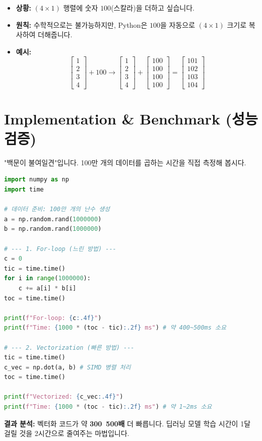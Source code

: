 \documentclass[11pt,a4paper]{book}
\theoremstyle{definition}
\begin{document}
\begin{itemize}
    \item \textbf{상황:} $(4 \times 1)$ 행렬에 숫자 $100$(스칼라)을 더하고 싶습니다.
    \item \textbf{원칙:} 수학적으로는 불가능하지만, Python은 $100$을 자동으로 $(4 \times 1)$ 크기로 복사하여 더해줍니다.
    \item \textbf{예시:} 
    $$ \begin{bmatrix} 1 \\ 2 \\ 3 \\ 4 \end{bmatrix} + 100 \rightarrow \begin{bmatrix} 1 \\ 2 \\ 3 \\ 4 \end{bmatrix} + \begin{bmatrix} 100 \\ 100 \\ 100 \\ 100 \end{bmatrix} = \begin{bmatrix} 101 \\ 102 \\ 103 \\ 104 \end{bmatrix} $$
\end{itemize}

\section{Implementation \& Benchmark (성능 검증)}

"백문이 불여일견"입니다. 100만 개의 데이터를 곱하는 시간을 직접 측정해 봅시다.

\begin{examplebox}[title={For-loop vs Vectorization 속도 대결}]
\begin{lstlisting}[language=Python, breaklines=true]
import numpy as np
import time

# 데이터 준비: 100만 개의 난수 생성
a = np.random.rand(1000000)
b = np.random.rand(1000000)

# --- 1. For-loop (느린 방법) ---
c = 0
tic = time.time()
for i in range(1000000):
    c += a[i] * b[i]
toc = time.time()

print(f"For-loop: {c:.4f}")
print(f"Time: {1000 * (toc - tic):.2f} ms") # 약 400~500ms 소요

# --- 2. Vectorization (빠른 방법) ---
tic = time.time()
c_vec = np.dot(a, b) # SIMD 병렬 처리
toc = time.time()

print(f"Vectorized: {c_vec:.4f}")
print(f"Time: {1000 * (toc - tic):.2f} ms") # 약 1~2ms 소요
\end{lstlisting}
\textbf{결과 분석:} 벡터화 코드가 약 \textbf{300~500배} 더 빠릅니다. 딥러닝 모델 학습 시간이 1달 걸릴 것을 2시간으로 줄여주는 마법입니다.
\end{examplebox}
\end{document}
